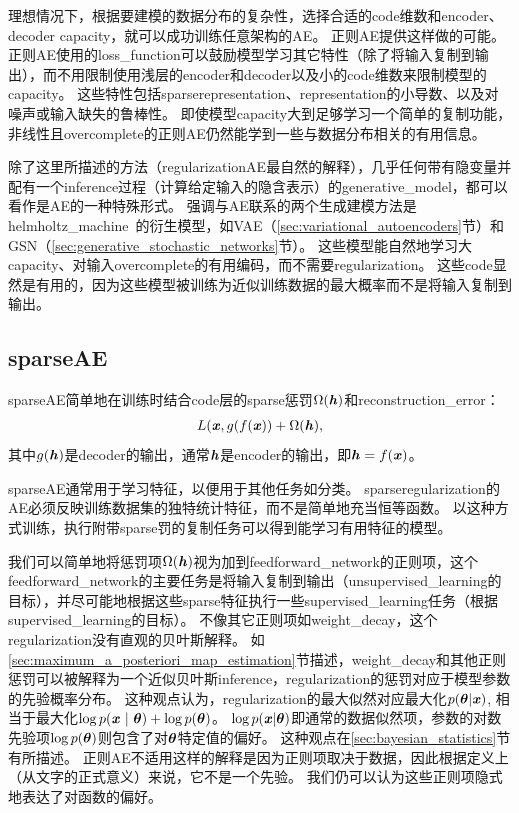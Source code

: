 理想情况下，根据要建模的数据分布的复杂性，选择合适的\gls{code}维数和\gls{encoder}、\gls{decoder}
\gls{capacity}，就可以成功训练任意架构的\gls{AE}。
正则\gls{AE}提供这样做的可能。
正则\gls{AE}使用的\gls{loss_function}可以鼓励模型学习其它特性（除了将输入复制到输出），而不用限制使用浅层的\gls{encoder}和\gls{decoder}以及小的\gls{code}维数来限制模型的\gls{capacity}。
这些特性包括\gls{sparse}\gls{representation}、\gls{representation}的小导数、以及对噪声或输入缺失的鲁棒性。
即使模型\gls{capacity}大到足够学习一个简单的复制功能，非线性且\gls{overcomplete}的正则\gls{AE}仍然能学到一些与数据分布相关的有用信息。


除了这里所描述的方法（\gls{regularization}\gls{AE}最自然的解释），几乎任何带有隐变量并配有一个\gls{inference}过程（计算给定输入的隐含表示）的\gls{generative_model}，都可以看作是\gls{AE}的一种特殊形式。
强调与\gls{AE}联系的两个生成建模方法是\gls{helmholtz_machine}~\citep{Hinton95}的衍生模型，如\gls{VAE}（\ref{sec:variational_autoencoders}节）和\gls{GSN}（\ref{sec:generative_stochastic_networks}节）。
这些模型能自然地学习大\gls{capacity}、对输入\gls{overcomplete}的有用编码，而不需要\gls{regularization}。
这些\gls{code}显然是有用的，因为这些模型被训练为近似训练数据的最大概率而不是将输入复制到输出。


\subsection{\gls{sparse}\gls{AE}}
\label{sec:sparse_autoencoders}
\gls{sparse}\gls{AE}简单地在训练时结合\gls{code}层的\gls{sparse}惩罚$\Omega(\boldsymbol{\mathit{h}})$和\gls{reconstruction_error}：
\begin{align}
L(\boldsymbol{\mathit{x}}, g(f(\boldsymbol{\mathit{x}})) + \Omega(\boldsymbol{\mathit{h}}),
\end{align}
其中$g(\boldsymbol{\mathit{h}})$是\gls{decoder}的输出，通常$\boldsymbol{\mathit{h}}$是\gls{encoder}的输出，即$\boldsymbol{\mathit{h}} = f(\boldsymbol{\mathit{x}})$。


\gls{sparse}\gls{AE}通常用于学习特征，以便用于其他任务如分类。
\gls{sparse}\gls{regularization}的\gls{AE}必须反映训练数据集的独特统计特征，而不是简单地充当恒等函数。
以这种方式训练，执行附带\gls{sparse}罚的复制任务可以得到能学习有用特征的模型。


我们可以简单地将惩罚项$\Omega(\boldsymbol{\mathit{h}})$视为加到\gls{feedforward_network}的正则项，这个\gls{feedforward_network}的主要任务是将输入复制到输出（\gls{unsupervised_learning}的目标），并尽可能地根据这些\gls{sparse}特征执行一些\gls{supervised_learning}任务（根据\gls{supervised_learning}的目标）。
不像其它正则项如\gls{weight_decay}，这个\gls{regularization}没有直观的贝叶斯解释。
如\ref{sec:maximum_a_posteriori_map_estimation}节描述，\gls{weight_decay}和其他正则惩罚可以被解释为一个近似贝叶斯\gls{inference}，\gls{regularization}的惩罚对应于模型参数的先验概率分布。
这种观点认为，\gls{regularization}的最大似然对应最大化$p(\boldsymbol{\theta} | \boldsymbol{\mathit{x}})$, 相当于最大化$\log p(\boldsymbol{\mathit{x}} ~|~ \boldsymbol{\theta}) + \log p(\boldsymbol{\theta})$。 $\log p(\boldsymbol{\mathit{x}} | \boldsymbol{\theta})$即通常的数据似然项，参数的对数先验项$\log p(\boldsymbol{\theta})$则包含了对$\boldsymbol{\theta}$特定值的偏好。
这种观点在\ref{sec:bayesian_statistics}节有所描述。
正则\gls{AE}不适用这样的解释是因为正则项取决于数据，因此根据定义上（从文字的正式意义）来说，它不是一个先验。
我们仍可以认为这些正则项隐式地表达了对函数的偏好。


